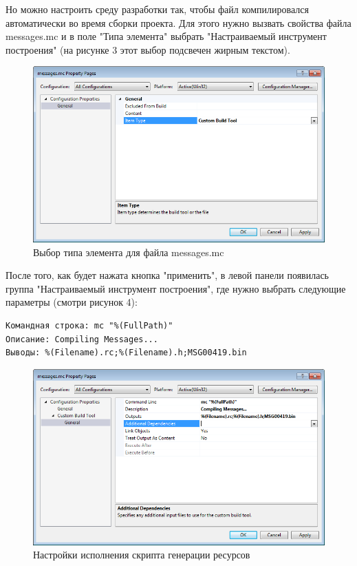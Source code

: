 \documentclass[a4paper, 12pt]{report}		%
\begin{document}
Но можно настроить среду разработки так, чтобы файл компилировался автоматически во время сборки проекта. Для этого нужно вызвать свойства файла messages.mc и в поле "Типа элемента" выбрать "Настраиваемый инструмент построения" (на рисунке 3 этот выбор подсвечен жирным текстом).

\begin{figure}[h!]
\centering
\includegraphics[scale=0.8]{res/message_property1}
\caption{Выбор типа элемента для файла messages.mc}
\end{figure}

После того, как будет нажата кнопка "применить", в левой панели появилась группа "Настраиваемый инструмент построения", где нужно выбрать следующие параметры (смотри рисунок 4):
\begin{verbatim}
Командная строка: mc "%(FullPath)"
Описание: Compiling Messages...
Выводы: %(Filename).rc;%(Filename).h;MSG00419.bin
\end{verbatim}

\begin{figure}[h!]
\centering
\includegraphics[scale=0.8]{res/message_property2}
\caption{Настройки исполнения скрипта генерации ресурсов}
\end{figure}
\end{document}
